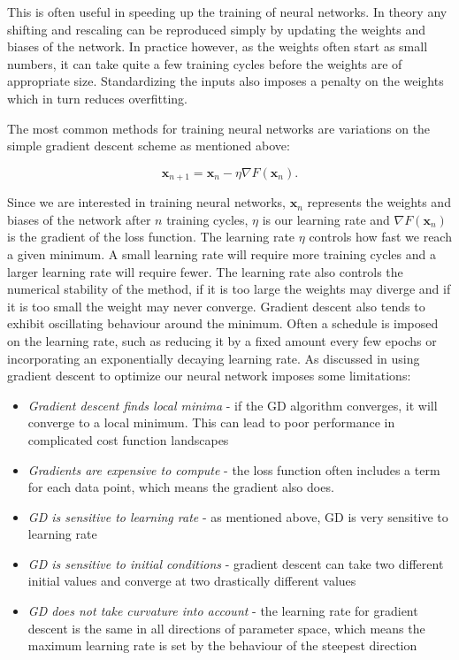 This is often useful in speeding up the training of neural networks.
In theory any shifting and rescaling can be reproduced simply
by updating the weights and biases of the network.
In practice however, as the weights often start as
small numbers, it can take quite a few training cycles before
the weights are of appropriate size.
Standardizing the inputs also imposes a penalty on the weights
which in turn reduces overfitting.
\par
The most common methods for training neural networks
are variations on the simple gradient descent scheme as mentioned
above:

\begin{equation}
 \bm{x}_{n+1} = \bm{x}_{n} - \eta \nabla F(\bm{x}_n) . 
\end{equation}

Since we are interested in training neural networks,
$\bm{x}_{n}$ represents the weights and biases of the network
after $n$ training cycles, $\eta$ is our learning rate
and $\nabla F(\bm{x}_n)$ is the gradient of the loss function.
The learning rate $\eta$ controls how fast we reach a given minimum.
A small learning rate will require more training cycles
and a larger learning rate will require fewer.
The learning rate also controls the numerical stability
of the method, if it is too large the weights may diverge
and if it is too small the weight may never converge.
Gradient descent also tends to exhibit oscillating behaviour
around the minimum. Often a schedule is imposed
on the learning rate, such as reducing it by a fixed amount
every few epochs or incorporating an exponentially decaying learning rate.
As discussed in \parencite[Mehta et. al]{mehta2019high} using gradient descent to optimize
our neural network imposes some limitations:

\begin{itemize}
    \item \textit{Gradient descent finds local minima} - 
        if the GD algorithm converges, it will converge to
        a local minimum. This can lead to poor performance
        in complicated cost function landscapes
    \item \textit{Gradients are expensive to compute} - 
        the loss function often includes a term for each
        data point, which means the gradient also does.
    \item \textit{GD is sensitive to learning rate} - 
        as mentioned above, GD is very sensitive to
        learning rate
    \item \textit{GD is sensitive to initial conditions} - 
        gradient descent can take two different initial values
        and converge at two drastically different values
    \item \textit{GD does not take curvature into account} - 
        the learning rate for gradient descent is the same
        in all directions of parameter space, which means
        the maximum learning rate is set by the behaviour of the
        steepest direction
\end{itemize}

